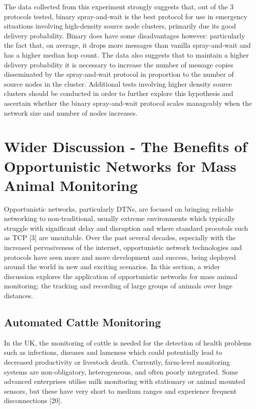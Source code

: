 \documentclass{article}
\begin{document}
\newline The data collected from this experiment strongly suggests that, out of the 3 protocols tested, binary spray-and-wait is the best protocol for use in emergency situations involving high-density source node clusters, primarily due its good delivery probability. Binary does have some disadvantages however: particularly the fact that, on average, it drops more messages than vanilla spray-and-wait and has a higher median hop count. The data also suggests that to maintain a higher delivery probability it is necessary to increase the number of message copies disseminated by the spray-and-wait protocol in proportion to the number of source nodes in the cluster. Additional tests involving higher density source clusters should be conducted in order to further explore this hypothesis and ascertain whether the binary spray-and-wait protocol scales manageably when the network size and number of nodes increases.

\section{Wider Discussion - The Benefits of Opportunistic Networks for Mass Animal Monitoring}
Opportunistic networks, particularly DTNs, are focused on bringing reliable networking to non-traditional, usually extreme environments which typically struggle with significant delay and disruption and where standard procotols such as TCP [3] are unsuitable. Over the past several decades, especially with the increased pervasiveness of the internet, opportunistic network technologies and protocols have seen more and more development and success, being deployed around the world in new and exciting scenarios. In this section, a wider discussion explores the application of opportunistic networks for mass animal monitoring; the tracking and recording of large groups of animals over huge distances.\\

\subsection{Automated Cattle Monitoring}

\noindent In the UK, the monitoring of cattle is needed for the detection of health problems such as infections, diseases and lameness which could potentially lead to decreased productivity or livestock death. Currently, farm-level monitoring systems are non-obligatory, heterogeneous, and often poorly integrated. Some advanced enterprises utilise milk monitoring with stationary or animal mounted sensors, but these have very short to medium ranges and experience frequent disconnections [20].\\
\end{document}

